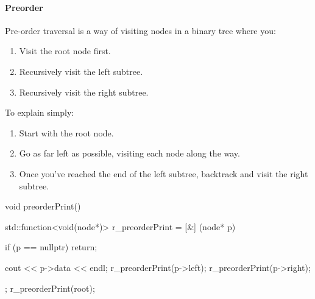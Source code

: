 \documentclass{report}
\begin{document}
\bigbreak \noindent 
\pagebreak \bigbreak \noindent 
\paragraph{Preorder}
\bigbreak \noindent \bigbreak \noindent 
Pre-order traversal is a way of visiting nodes in a binary tree where you:
\begin{enumerate}
    \item Visit the root node first.
    \item Recursively visit the left subtree.
    \item Recursively visit the right subtree.
\end{enumerate}
To explain simply:
\begin{enumerate}
    \item Start with the root node.
    \item Go as far left as possible, visiting each node along the way.
    \item Once you've reached the end of the left subtree, backtrack and visit the right subtree.
\end{enumerate}
\bigbreak \noindent 
\begin{cppcode}
    void preorderPrint() {
        std::function<void(node*)> r_preorderPrint = [&] (node* p) {
            if (p == nullptr) return;

            cout << p->data << endl;
            r_preorderPrint(p->left);
            r_preorderPrint(p->right);
        };
        r_preorderPrint(root);
    }
\end{cppcode}

\bigbreak \noindent 
\end{document}
